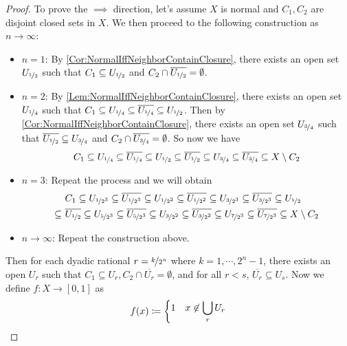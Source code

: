 \documentclass[screen]{techreport}
\numberwithin{equation}{section}
\begin{document}
\begin{proof}
	To prove the $\implies$ direction, let's assume $X$ is normal and $C_1,C_2$ are disjoint closed sets in $X$. We then proceed to the following construction as $n \to \infty$:
	\begin{itemize}
		\item $n=1$: By \cref{Cor:NormalIffNeighborContainClosure}, there exists an open set $U_{\nicefrac{1}{2}}$ such that $C_1 \subseteq U_{\nicefrac{1}{2}}$ and $C_2 \cap \overline{U_{\nicefrac{1}{2}}} = \emptyset$.
		\item $n=2$: By \cref{Lem:NormalIffNeighborContainClosure}, there exists an open set $U_{\nicefrac{1}{4}}$ such that $C_1 \subseteq U_{\nicefrac{1}{4}} \subseteq \overline{U_{\nicefrac{1}{4}}} \subseteq U_{\nicefrac{1}{2}}$.
		Then by \cref{Cor:NormalIffNeighborContainClosure}, there exists an open set $U_{\nicefrac{3}{4}}$ such that $\overline{U_{\nicefrac{1}{2}}} \subseteq U_{\nicefrac{3}{4}}$ and $C_2 \cap \overline{U_{\nicefrac{3}{4}}} = \emptyset$.
		So now we have
		\[
		C_1 \subseteq U_{\nicefrac{1}{4}} \subseteq \overline{U_{\nicefrac{1}{4}}} \subseteq U_{\nicefrac{1}{2}} \subseteq \overline{U_{\nicefrac{1}{2}}} \subseteq   U_{\nicefrac{3}{4}} \subseteq \overline{U_{\nicefrac{3}{4}}} \subseteq X \setminus C_2
		\]
		\item $n = 3$: Repeat the process and we will obtain
		\begin{align*}
		& C_1 \subseteq U_{\nicefrac{1}{2^3}} \subseteq \overline{U_{\nicefrac{1}{2^3}}} \subseteq U_{\nicefrac{1}{2^2}} \subseteq \overline{U_{\nicefrac{1}{2^2}} } \subseteq U_{\nicefrac{3}{2^3}} \subseteq \overline{U_{\nicefrac{3}{2^3}}} \subseteq U_{\nicefrac{1}{2}} \\
		\subseteq ~ & \overline{U_{\nicefrac{1}{2}}} \subseteq U_{\nicefrac{5}{2^3}} \subseteq \overline{U_{\nicefrac{5}{2^3}}} \subseteq U_{\nicefrac{3}{2^2}} \subseteq \overline{U_{\nicefrac{3}{2^2}}} \subseteq U_{\nicefrac{7}{2^3}} \subseteq \overline{U_{\nicefrac{7}{2^3}}} \subseteq X \setminus C_2
		\end{align*}
		\item $n \to \infty$: Repeat the construction above.
	\end{itemize}
	Then for each dyadic rational $r = \nicefrac{k}{2^n}$ where $k=1,\cdots,2^n-1$, there exists an open $U_r$ such that $C_1 \subseteq U_r, C_2 \cap \overline{U_r} = \emptyset$, and for all $r < s$, $\overline{U_r} \subseteq U_s$.
	Now we define $f : X \to [0,1]$ as
	\[
	f(x) \coloneqq \begin{dcases}
 		1 & x \not\in \bigcup_r U_r \\

\end{dcases}\]
\end{proof}
\end{document}

